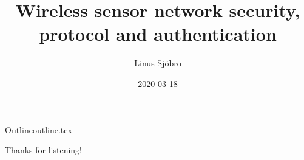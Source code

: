 \documentclass{beamer}
\title{Wireless sensor network security, protocol and authentication}
\date{2020-03-18}
\author{Linus Sjöbro}
\institute{Mid Sweden University}
\begin{document}
  \maketitle

  \begin{notedFrame}{Outline}{outline.tex}
    \tableofcontents
  \end{notedFrame}
  
  
  
  

  \begin{frame}[standout]
    Thanks for listening!
  \end{frame}
\end{document}
